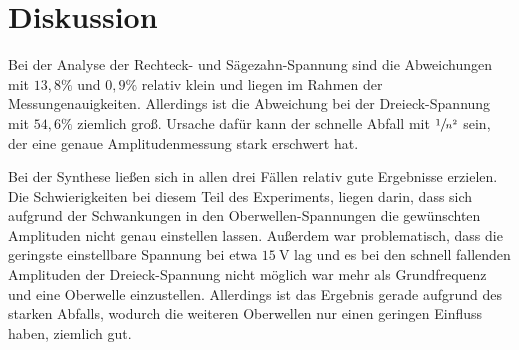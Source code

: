 \section{Diskussion}

Bei der Analyse der Rechteck- und Sägezahn-Spannung sind die Abweichungen mit $13,8 \%$ und $0,9 \%$
relativ klein und liegen im Rahmen der Messungenauigkeiten.
Allerdings ist die Abweichung bei der Dreieck-Spannung mit $54,6 \%$ ziemlich groß.
Ursache dafür kann der schnelle Abfall mit $\sfrac{1}{n^2}$ sein, der eine genaue Amplitudenmessung stark
erschwert hat.

Bei der Synthese ließen sich in allen drei Fällen relativ gute Ergebnisse erzielen.
Die Schwierigkeiten bei diesem Teil des Experiments, liegen darin, dass sich aufgrund der Schwankungen in den
Oberwellen-Spannungen die gewünschten Amplituden nicht genau einstellen lassen.
Außerdem war problematisch, dass die geringste einstellbare Spannung bei etwa $\SI{15}{\V}$ lag
und es bei den schnell fallenden Amplituden der Dreieck-Spannung nicht möglich war mehr als
Grundfrequenz und eine Oberwelle einzustellen.
Allerdings ist das Ergebnis gerade aufgrund des starken Abfalls, wodurch die weiteren Oberwellen nur einen
geringen Einfluss haben, ziemlich gut.
